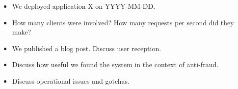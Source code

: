 \begin{itemize}
    \item We deployed application X on YYYY-MM-DD.
    \item How many clients were involved?  How many requests per second did they make?
    \item We published a blog post.  Discuss user reception.
    \item Discuss how useful we found the system in the context of anti-fraud.
    \item Discuss operational issues and gotchas.
\end{itemize}
